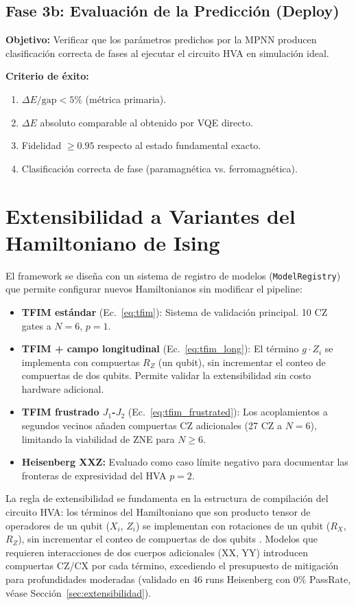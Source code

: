 \documentclass[11pt,a4paper,spanish]{book}
\begin{document}
\subsection{Fase 3b: Evaluación de la Predicción (Deploy)}

\textbf{Objetivo:} Verificar que los parámetros predichos por la MPNN producen clasificación correcta de fases al ejecutar el circuito HVA en simulación ideal.

\textbf{Criterio de éxito:}
\begin{enumerate}
    \item $\Delta E/\text{gap} < 5\%$ (métrica primaria).
    \item $\Delta E$ absoluto comparable al obtenido por VQE directo.
    \item Fidelidad $\geq 0.95$ respecto al estado fundamental exacto.
    \item Clasificación correcta de fase (paramagnética vs. ferromagnética).
\end{enumerate}

\section{Extensibilidad a Variantes del Hamiltoniano de Ising}

El framework se diseña con un sistema de registro de modelos (\texttt{ModelRegistry}) que permite configurar nuevos Hamiltonianos sin modificar el pipeline:

\begin{itemize}
    \item \textbf{TFIM estándar} (Ec.~\ref{eq:tfim}): Sistema de validación principal. 10 CZ gates a $N=6$, $p=1$.
    \item \textbf{TFIM + campo longitudinal} (Ec.~\ref{eq:tfim_long}): El término $g \cdot Z_i$ se implementa con compuertas $R_Z$ (un qubit), sin incrementar el conteo de compuertas de dos qubits. Permite validar la extensibilidad sin costo hardware adicional.
    \item \textbf{TFIM frustrado $J_1$-$J_2$} (Ec.~\ref{eq:tfim_frustrated}): Los acoplamientos a segundos vecinos añaden compuertas CZ adicionales (27 CZ a $N=6$), limitando la viabilidad de ZNE para $N \geq 6$.
    \item \textbf{Heisenberg XXZ:} Evaluado como caso límite negativo para documentar las fronteras de expresividad del HVA $p=2$.
\end{itemize}

La regla de extensibilidad se fundamenta en la estructura de compilación del circuito HVA: los términos del Hamiltoniano que son producto tensor de operadores de un qubit ($X_i$, $Z_i$) se implementan con rotaciones de un qubit ($R_X$, $R_Z$), sin incrementar el conteo de compuertas de dos qubits \citep{wiersema2020}. Modelos que requieren interacciones de dos cuerpos adicionales (XX, YY) introducen compuertas CZ/CX por cada término, excediendo el presupuesto de mitigación para profundidades moderadas (validado en 46 runs Heisenberg con 0\% PassRate, véase Sección~\ref{sec:extensibilidad}).
\end{document}
